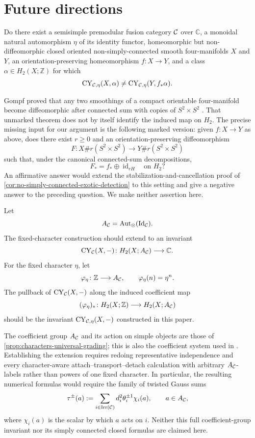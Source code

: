 \section{Future directions}
\label{sec:future-directions}

\begin{question}
\label{conj:non-simply-connected-detection}
Do there exist a semisimple premodular fusion category $\mathcal{C}$ over $\mathbb C$,
a monoidal natural automorphism $\eta$ of its identity functor, homeomorphic
but non-diffeomorphic closed oriented non-simply-connected smooth
four-manifolds $X$ and $Y$, an orientation-preserving homeomorphism
$f\colon X\to Y$, and a class $\alpha\in H_2(X;\mathbb Z)$ for which
\[
  \operatorname{CY}_{\mathcal{C},\eta}(X,\alpha)
  \ne\operatorname{CY}_{\mathcal{C},\eta}(Y,f_*\alpha).
\]
\end{question}

Gompf proved that any two smoothings of a compact orientable four-manifold
become diffeomorphic after connected sum with copies of $S^2\times S^2$
\cite{Gompf1984}.  That unmarked theorem does not by itself identify the
induced map on $H_2$.  The precise missing input for our argument is the
following marked version: given $f\colon X\to Y$ as above, does there exist
$r\geq0$ and an orientation-preserving diffeomorphism
\[
 F\colon X\#r(S^2\times S^2)\longrightarrow
          Y\#r(S^2\times S^2)
\]
such that, under the canonical connected-sum decompositions,
\[
 F_*=f_*\oplus\operatorname{id}_{rH}
 \quad\text{on }H_2?
\]
An affirmative answer would extend the stabilization-and-cancellation proof
of \cref{cor:no-simply-connected-exotic-detection} to this setting and give a
negative answer to the preceding question.  We make neither assertion here.

\begin{conjecture}
\label{conj:full-coefficient-extension}
Let
\[
  A_{\mathcal{C}}=\operatorname{Aut}_{\otimes}(\operatorname{Id}_{\mathcal{C}}).
\]
The fixed-character construction should extend to an invariant
\[
  \operatorname{CY}_{\mathcal{C}}(X,-)\colon H_2(X;A_{\mathcal{C}})\longrightarrow\mathbb C.
\]
For the fixed character $\eta$, let
\[
  \varphi_\eta\colon\mathbb Z\longrightarrow A_{\mathcal{C}},
  \qquad \varphi_\eta(n)=\eta^n.
\]
The pullback of $\operatorname{CY}_{\mathcal{C}}(X,-)$ along the induced coefficient map
\[
  (\varphi_\eta)_*\colon H_2(X;\mathbb Z)\longrightarrow H_2(X;A_{\mathcal{C}})
\]
should be the invariant $\operatorname{CY}_{\mathcal{C},\eta}(X,-)$ constructed in this paper.
\end{conjecture}

The coefficient group $A_{\mathcal{C}}$ and its action on simple objects are those
of \cref{prop:characters-universal-grading}; this is also the coefficient
system used in \cite[Definitions~1 and~9]{Yetter1993}.  Establishing the
extension requires redoing representative independence and every
character-aware attach--transport--detach calculation with arbitrary
$A_{\mathcal{C}}$-labels rather than powers of one fixed character.  In particular,
the resulting numerical formulas would require the family of twisted Gauss
sums
\[
  \tau^{\pm}(a)
  :=\sum_{i\in\operatorname{Irr}(\mathcal{C})}
       d_i^2\theta_i^{\pm1}\chi_i(a),
  \qquad a\in A_{\mathcal{C}},
\]
where $\chi_i(a)$ is the scalar by which $a$ acts on $i$.  Neither this full
coefficient-group invariant nor its simply connected closed formulas are
claimed here.
